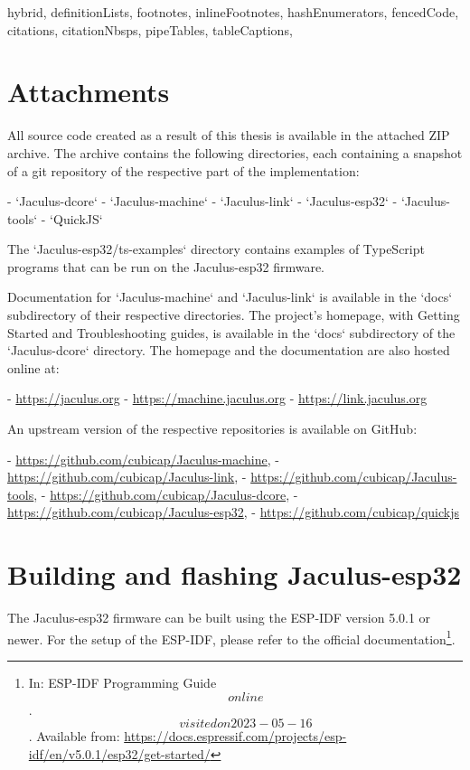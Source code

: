 \begin{markdown*}{%
  hybrid,
  definitionLists,
  footnotes,
  inlineFootnotes,
  hashEnumerators,
  fencedCode,
  citations,
  citationNbsps,
  pipeTables,
  tableCaptions,
}

\appendix

\chapter{Attachments}

All source code created as a result of this thesis is available in the attached ZIP archive. The archive contains the following directories, each containing a snapshot of a git repository of the respective part of the implementation:

  - `Jaculus-dcore`
  - `Jaculus-machine`
  - `Jaculus-link`
  - `Jaculus-esp32`
  - `Jaculus-tools`
  - `QuickJS`

The `Jaculus-esp32/ts-examples` directory contains examples of TypeScript programs that can be run on the Jaculus-esp32 firmware.

Documentation for `Jaculus-machine` and `Jaculus-link` is available in the `docs` subdirectory of their respective directories. The project's homepage, with Getting Started and Troubleshooting guides, is available in the `docs` subdirectory of the `Jaculus-dcore` directory. The homepage and the documentation are also hosted online at:

  - \url{https://jaculus.org}
  - \url{https://machine.jaculus.org}
  - \url{https://link.jaculus.org}

An upstream version of the respective repositories is available on GitHub:

  - \url{https://github.com/cubicap/Jaculus-machine},
  - \url{https://github.com/cubicap/Jaculus-link},
  - \url{https://github.com/cubicap/Jaculus-tools},
  - \url{https://github.com/cubicap/Jaculus-dcore},
  - \url{https://github.com/cubicap/Jaculus-esp32},
  - \url{https://github.com/cubicap/quickjs}


\chapter{Building and flashing Jaculus-esp32}

The Jaculus-esp32 firmware can be built using the ESP-IDF version 5.0.1 or newer. For the setup of the ESP-IDF, please refer to the official documentation\footnote{In: ESP-IDF Programming Guide \[online\]. \[visited on 2023-05-16\]. Available from: \url{https://docs.espressif.com/projects/esp-idf/en/v5.0.1/esp32/get-started/}}.


\end{markdown*}

